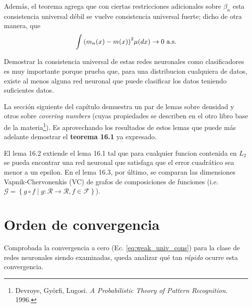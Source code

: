 \documentclass[12pt]{extarticle}
\newenvironment{comentarios_meta}
    {\begin{framed}\noindent\textcolor{red}{\textbf{\#}}}
    {\end{framed}}
\begin{document}
    Además, el teorema agrega que con ciertas restricciones adicionales sobre $\beta_n$ esta consistencia universal débil se vuelve consistencia universal fuerte; dicho de otra manera, que
    \begin{equation*}
        \int {(m_n(x) - m(x))}^{2} \mu(dx) \to 0
        \textnormal{ a.s.}
    \end{equation*}

    Demostrar la consistencia universal de estas redes neuronales como clasificadores es muy importante porque prueba que, para una distribucion cualquiera de datos, existe al menos alguna red neuronal que puede clasificar los datos teniendo suficientes datos.
    
    La sección siguiente del capítulo demuestra un par de lemas sobre densidad y otros sobre \textit{covering numbers} (cuyas propiedades se describen en el otro libro base de la materia\footnote{Devroye, Györfi, Lugosi. \textit{A Probabilistic Theory of Pattern Recognition}. 1996.}). Es aprovechando los resultados de estos lemas que puede más adelante demostrar el \textbf{teorema 16.1} ya expresado.
    
    El lema 16.2 extiende el lema 16.1 tal que para cualquier funcion contenida en $L_2$ se pueda encontrar una red neuronal que satisfaga que el error cuadrático sea menor a un epsilon. En el lema  16.3, por último, se comparan las dimensiones Vapnik-Chervonenkis (VC) de grafos de composiciones de funciones (i.e. $\mathcal{G} = \left\{ g \circ f \mid g : \mathcal{R} \rightarrow \mathcal{R}, f \in \mathcal{F} \right\}$).


\section{Orden de convergencia}

    Comprobada la convergencia a cero (Ec. \ref{eq:weak_univ_cons}) para la clase de redes neuronales siendo examinadas, queda analizar qué tan \textit{rápido} ocurre esta convergencia.
    
\end{document}
